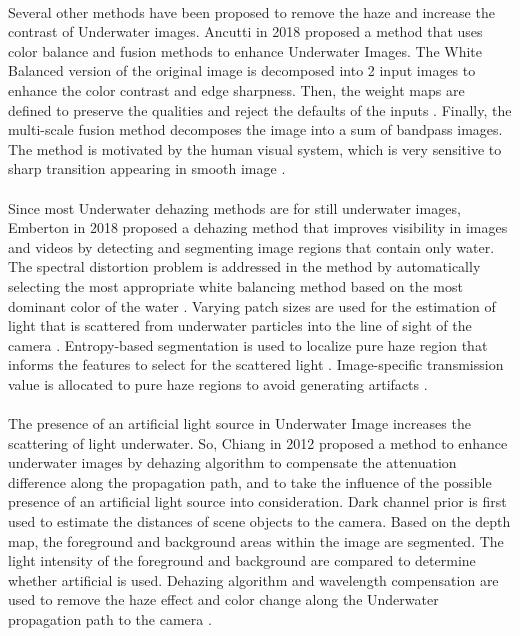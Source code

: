 \documentclass[a4paper,11pt,oneside]{article}
\begin{document}
  \\
  Several other methods have been proposed to remove the haze and increase the contrast of Underwater images. Ancutti in 2018 \cite{16} proposed a method that uses color balance and fusion methods to enhance Underwater Images. The White Balanced version of the original image is decomposed into 2 input images to enhance the color contrast and edge sharpness. Then, the weight maps are defined to preserve the qualities and reject the defaults of the inputs \cite{16}. Finally, the multi-scale fusion method decomposes the image into a sum of bandpass images. The method is motivated by the human visual system, which is very sensitive to sharp transition appearing in smooth image \cite{16}.\\
  \\
  Since most Underwater dehazing methods are for still underwater images, Emberton \cite{2} in 2018 proposed a dehazing method that improves visibility in images and videos by detecting and segmenting image regions that contain only water. The spectral distortion problem is addressed in the method by automatically selecting the most appropriate white balancing method based on the most dominant color of the water \cite{2}. Varying patch sizes are used for the estimation of light that is scattered from underwater particles into the line of sight of the camera \cite{2}. Entropy-based segmentation is used to localize pure haze region that informs the features to select for the scattered light \cite{2}. Image-specific transmission value is allocated to pure haze regions to avoid generating artifacts \cite{2}.\\
  \\
   The presence of an artificial light source in Underwater Image increases the scattering of light underwater. So, Chiang in 2012 \cite{13} proposed a method to enhance underwater images by dehazing algorithm to compensate the attenuation difference along the propagation path, and to take the influence of the possible presence of an artificial light source into consideration. Dark channel prior is first used to estimate the distances of scene objects to the camera. Based on the depth map, the foreground and background areas within the image are segmented. The light intensity of the foreground and background are compared to determine whether artificial is used. Dehazing algorithm and wavelength compensation are used to remove the haze effect and color change along the Underwater propagation path to the camera \cite{13}.\\
\end{document}

